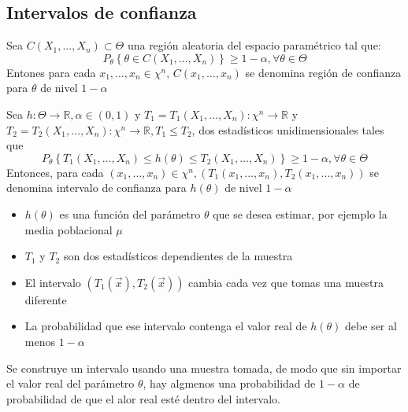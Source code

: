 \subsection{Intervalos de confianza}
\begin{definición}
    Sea $C(X_{1}, \ldots, X_{n}) \subset \Theta$ una región aleatoria del espacio paramétrico tal que: 
    $$P_{\theta}\left\{\theta \in C(X_{1}, \ldots, X_{n})\right\} \geq 1-\alpha, \forall \theta \in \Theta$$
    Entones para cada $x_{1}, \ldots, x_{n} \in \chi^{n}$, $C(x_{1}, \ldots, x_{n})$ se denomina región de confianza para $\theta$ de nivel $1-\alpha$
\end{definición}

\ejemplo{

}

\begin{definición}
Sea $h: \Theta \rightarrow \mathbb{R}, \alpha \in(0,1)$ y $T_{1}=T_{1}\left(X_{1}, \ldots, X_{n}\right): \chi^{n} \rightarrow \mathbb{R}$ y $T_{2}=T_{2}\left(X_{1}, \ldots, X_{n}\right): \chi^{n} \rightarrow \mathbb{R}, T_{1} \leq T_{2}$, dos estadísticos unidimensionales tales que
$$P_{\theta}\left\{T_{1}\left(X_{1}, \ldots, X_{n}\right) \leq h(\theta) \leq T_{2}\left(X_{1}, \ldots, X_{n}\right)\right\} \geq 1-\alpha, \forall \theta \in \Theta$$
Entonces, para cada $\left(x_{1}, \ldots, x_{n}\right) \in \chi^{n},\left(T_{1}\left(x_{1}, \ldots, x_{n}\right), T_{2}\left(x_{1}, \ldots, x_{n}\right)\right)$ se denomina intervalo de confianza para $h(\theta)$ de nivel $1-\alpha$
\end{definición}

\begin{observación}
    \vspace{-\topsep}
    \vspace{-\topsep}
    \begin{itemize}
        \item $h(\theta)$ es una función del parámetro $\theta$ que se desea estimar, por ejemplo la media poblacional $\mu$
        \item $T_{1}$ y $T_{2}$ son dos estadísticos dependientes de la muestra
        \item El intervalo $(T_{1}(\vec{x}), T_{2}(\vec{x}))$ cambia cada vez que tomas una muestra diferente
        \item La probabilidad que ese intervalo contenga el valor real de $h(\theta)$ debe ser al menos $1-\alpha$
    \end{itemize}
    Se construye un intervalo usando una muestra tomada, de modo que sin importar el valor real del parámetro $\theta$, hay algmenos una probabilidad de $1-\alpha$ de probabilidad de que el alor real esté dentro del intervalo.
\end{observación}

